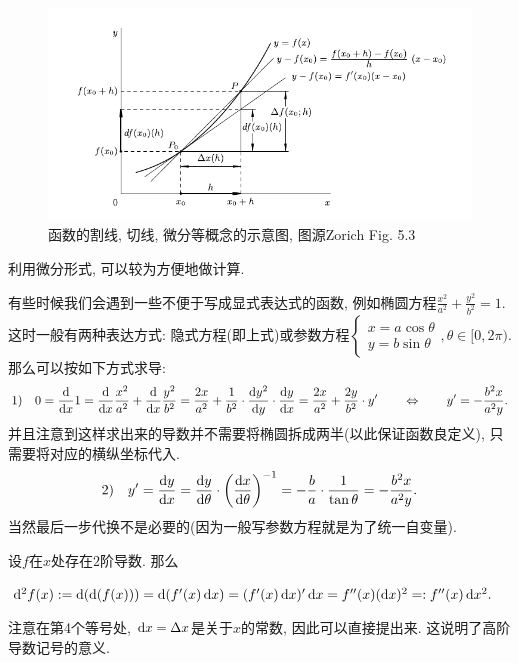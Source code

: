 \begin{figure}[H]
	\centering
	\includegraphics[width=12cm]{./attachment/differential_of_a_function.pdf}
	\caption{函数的割线, 切线, 微分等概念的示意图, 图源Zorich Fig. 5.3}
\end{figure}

利用微分形式, 可以较为方便地做计算. 

\begin{example}
	有些时候我们会遇到一些不便于写成显式表达式的函数, 例如椭圆方程$\displaystyle \frac{x^2}{a^2}+\frac{y^2}{b^2}=1$. 这时一般有两种表达方式: 隐式方程(即上式)或参数方程$\begin{cases}
	x=a\cos \theta \\ y=b\sin \theta
\end{cases},\theta \in [0,2\pi )$. 那么可以按如下方式求导: 
$$1)\quad 0 = \frac{\dif}{\dif x} 1 = \frac{\dif}{\dif x} \frac{x^2}{a^2} + \frac{\dif}{\dif x} \frac{y^2}{b^2} = \frac{2x}{a^2} + \frac{1}{b^2} \cdot \frac{\dif y^2}{\dif y} \cdot \frac{\dif y}{\dif x} = \frac{2x}{a^2} + \frac{2y}{b^2} \cdot y'\qquad \Leftrightarrow \qquad y' = -\frac{b^2x}{a^2y}. $$
并且注意到这样求出来的导数并不需要将椭圆拆成两半(以此保证函数良定义), 只需要将对应的横纵坐标代入. 
$$2)\quad y' = \frac{\mathop{}\!\mathrm{d} y}{\mathop{}\!\mathrm{d} x} = \frac{\mathop{}\!\mathrm{d} y}{\mathop{}\!\mathrm{d} \theta} \cdot \left( \frac{\mathop{}\!\mathrm{d} x}{\mathop{}\!\mathrm{d} \theta} \right)^{-1} = -\frac{b}{a} \cdot \frac{1}{\tan \theta} = -\frac{b^2x}{a^2y}. $$
当然最后一步代换不是必要的(因为一般写参数方程就是为了统一自变量). 
\end{example}

\begin{example}
	设$f$在$x$处存在$2$阶导数. 那么
	\begin{center}
		$\dif ^2 f(x) := \dif (\dif (f(x))) = \dif (f'(x) \dif x) = (f'(x) \dif x)' \dif x = f''(x) (\dif x)^2 =: f''(x) \dif x^2. $
	\end{center}
	注意在第4个等号处, $\mathop{}\!\mathrm{d} x=\Delta x$是关于$x$的常数, 因此可以直接提出来. 这说明了高阶导数记号的意义. 
\end{example}




